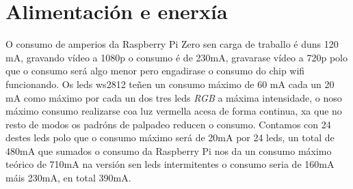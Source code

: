 \section{Alimentación e enerxía}
O consumo de amperios da Raspberry Pi Zero sen carga de traballo é duns 120 mA, gravando vídeo a 1080p o consumo é de 230mA, gravarase vídeo a 720p polo que o consumo será algo menor pero engadirase o consumo do chip wifi funcionando. Os leds ws2812 teñen un consumo máximo de 60 mA cada un 20 mA como máximo por cada un dos tres leds \emph{RGB} a máxima intensidade, o noso máximo consumo realizarse coa luz vermella acesa de forma continua, xa que no resto de modos os padróns de palpadeo reducen o consumo. Contamos con 24 destes leds polo que o consumo máximo será de 20mA por 24 leds, un total de 480mA que sumados o consumo da Raspberry Pi nos da un consumo máximo teórico de 710mA na versión sen leds intermitentes o consumo seria de 160mA máis 230mA, en total 390mA.

